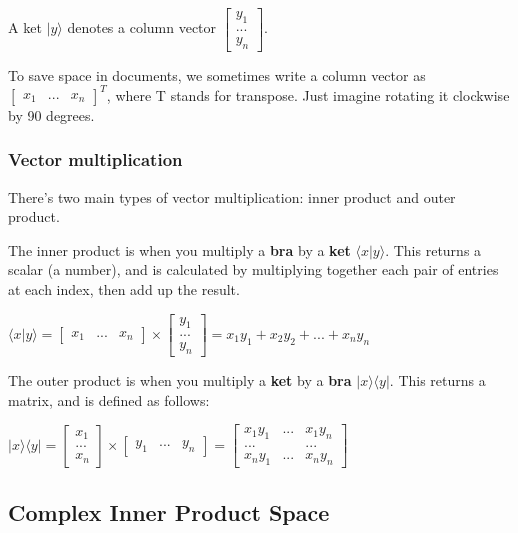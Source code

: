 \documentclass[12pt]{article}
\begin{document}
A ket $\lvert y \rangle$ denotes a column vector $\begin{bmatrix}y_1\\...\\y_n\end{bmatrix}$. 

To save space in documents, we sometimes write a column vector as $\begin{bmatrix}x_1 & ... & x_n\end{bmatrix}^T$, where T stands for transpose. Just imagine rotating it clockwise by 90 degrees.

\subsubsection{Vector multiplication}

There's two main types of vector multiplication: inner product and outer product. 

The inner product is when you multiply a \textbf{bra} by a \textbf{ket} $\langle x \lvert y \rangle$. This returns a scalar (a number), and is calculated by multiplying together each pair of entries at each index, then add up the result.

$ \langle x \lvert y \rangle = \begin{bmatrix}x_1 & ... & x_n\end{bmatrix} \times \begin{bmatrix}y_1\\...\\y_n\end{bmatrix} = x_1y_1 + x_2y_2 + ... + x_ny_n$

The outer product is when you multiply a \textbf{ket} by a \textbf{bra} $\lvert x \rangle \langle y \rvert$. This returns a matrix, and is defined as follows:

$\lvert x \rangle \langle y \rvert = \begin{bmatrix}x_1\\...\\x_n\end{bmatrix} \times \begin{bmatrix}y_1 & ... & y_n\end{bmatrix} = \begin{bmatrix} x_1y_1 & ... & x_1y_n \\ ... & & ... \\ x_ny_1 & ... & x_ny_n\end{bmatrix}$

\subsection{Complex Inner Product Space}
\end{document}

